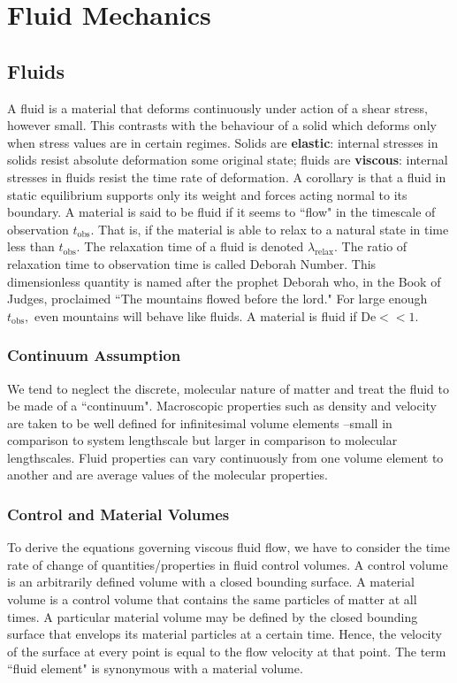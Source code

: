 \chapter{Fluid Mechanics}

\section{Fluids}
A fluid is a material that deforms continuously under action of a shear stress, however small. This contrasts with the behaviour of a solid which deforms only when stress values are in certain regimes. Solids are \textbf{elastic}: internal stresses in solids resist absolute deformation \vvis some original state; fluids are \textbf{viscous}: internal stresses in fluids resist the time rate of deformation. A corollary is that a fluid in static equilibrium supports only its weight and forces acting normal to its boundary. A material is said to be fluid if it seems to ``flow" in the timescale of observation $t_\mathrm{obs}$. That is, if the material is able to relax to a natural state in time less than $t_\mathrm{obs}.$ The relaxation time of a fluid is denoted $\lambda_\text{relax}$. The ratio of relaxation time to observation time is called Deborah Number. This dimensionless quantity is named after the prophet Deborah who, in the Book of Judges, proclaimed ``The mountains flowed before the lord." For large enough $t_\text{obs},$ even mountains will behave like fluids. A material is fluid if $\text{De}<<1.$
\subsection{Continuum Assumption}
We tend to neglect the discrete, molecular nature of matter and treat the fluid to be made of a ``continuum". Macroscopic properties such as density and velocity are taken to be well defined for infinitesimal volume elements --small in comparison to system lengthscale but larger in comparison to molecular lengthscales. Fluid properties can vary continuously from one volume element to another and are average values of the molecular properties.
\subsection{Control and Material Volumes}
To derive the equations governing viscous fluid flow, we have to consider the time rate of change of quantities/properties in fluid control volumes. A control volume is an arbitrarily defined volume with a closed bounding surface. A material volume is a control volume that contains the same particles of matter at all times. A particular material volume may be defined by the closed bounding surface that envelops its material particles at a certain time. Hence, the velocity of the surface at every point is equal to the flow velocity at that point. The term ``fluid element" is synonymous with a material volume.

